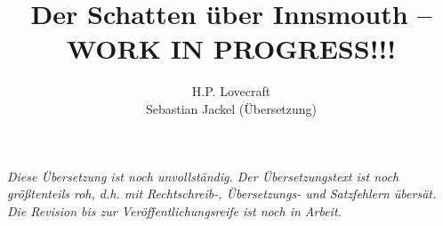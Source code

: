 \documentclass[a4paper,openany]{memoir}
\begin{document}
\title{Der Schatten über Innsmouth -- WORK IN PROGRESS!!!}
\author{H.P. Lovecraft\\
		Sebastian Jackel (Übersetzung)}
\date{}
\maketitle

\textit{Diese Übersetzung ist noch unvollständig. Der Übersetzungstext ist noch größtenteils roh, d.h. mit Rechtschreib-, Übersetzungs- und Satzfehlern übersät. Die Revision bis zur Veröffentlichungsreife ist noch in Arbeit.}






\end{document}
